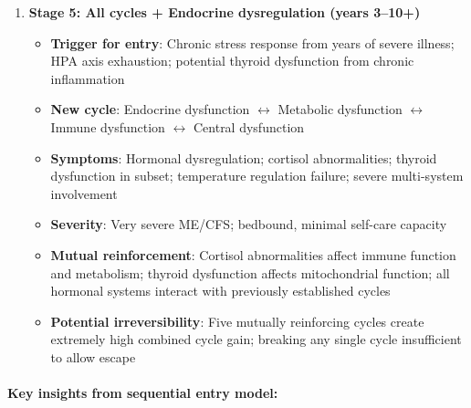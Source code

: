 \begin{enumerate}
    \item \textbf{Stage 5: All cycles + Endocrine dysregulation (years 3--10+)}
    \begin{itemize}
        \item \textbf{Trigger for entry}: Chronic stress response from years of severe illness; HPA axis exhaustion; potential thyroid dysfunction from chronic inflammation
        \item \textbf{New cycle}: Endocrine dysfunction $\leftrightarrow$ Metabolic dysfunction $\leftrightarrow$ Immune dysfunction $\leftrightarrow$ Central dysfunction
        \item \textbf{Symptoms}: Hormonal dysregulation; cortisol abnormalities; thyroid dysfunction in subset; temperature regulation failure; severe multi-system involvement
        \item \textbf{Severity}: Very severe ME/CFS; bedbound, minimal self-care capacity
        \item \textbf{Mutual reinforcement}: Cortisol abnormalities affect immune function and metabolism; thyroid dysfunction affects mitochondrial function; all hormonal systems interact with previously established cycles
        \item \textbf{Potential irreversibility}: Five mutually reinforcing cycles create extremely high combined cycle gain; breaking any single cycle insufficient to allow escape
    \end{itemize}
\end{enumerate}

\paragraph{Key insights from sequential entry model:}

